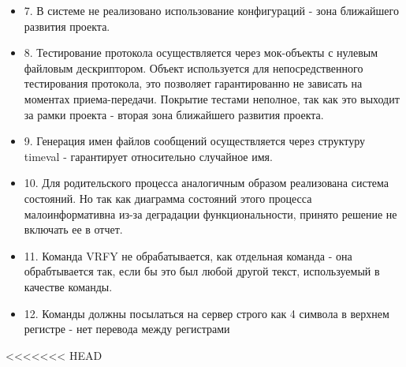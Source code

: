 \documentclass[a4paper,12pt]{report}
\begin{document}
\begin{itemize}
    \item 7. В системе не реализовано использование конфигураций - зона ближайшего развития проекта.
    \item 8. Тестирование протокола осуществляется через мок-объекты с нулевым файловым дескриптором. Объект используется для непосредственного тестирования протокола, это позволяет гарантированно не зависать на моментах приема-передачи. Покрытие тестами неполное, так как это выходит за рамки проекта - вторая зона ближайшего развития проекта.
    \item 9. Генерация имен файлов сообщений осуществляется через структуру timeval - гарантирует относительно случайное имя.
    \item 10. Для родительского процесса аналогичным образом реализована система состояний. Но так как диаграмма состояний этого процесса малоинформативна из-за деградации функциональности, принято решение не включать ее в отчет.
    \item 11. Команда VRFY  не обрабатывается, как отдельная команда - она обрабтывается так, если бы это был любой другой текст, используемый в качестве команды.
    \item 12. Команды должны посылаться на сервер строго как 4 символа в верхнем регистре - нет перевода между регистрами
\end{itemize}

<<<<<<< HEAD
\end{document}
